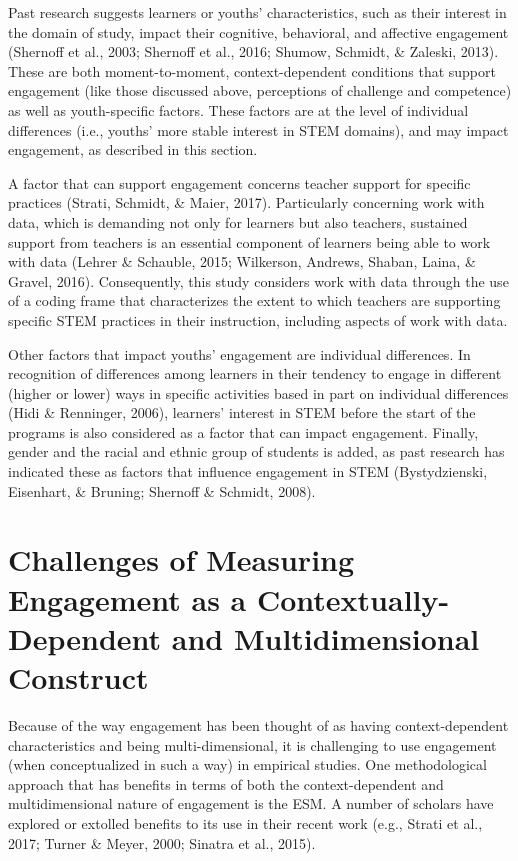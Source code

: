 \documentclass[]{book}
\theoremstyle{definition}
\theoremstyle{definition}
\theoremstyle{definition}
\theoremstyle{remark}
\begin{document}
Past research suggests learners or youths' characteristics, such as
their interest in the domain of study, impact their cognitive,
behavioral, and affective engagement (Shernoff et al., 2003; Shernoff et
al., 2016; Shumow, Schmidt, \& Zaleski, 2013). These are both
moment-to-moment, context-dependent conditions that support engagement
(like those discussed above, perceptions of challenge and competence) as
well as youth-specific factors. These factors are at the level of
individual differences (i.e., youths' more stable interest in STEM
domains), and may impact engagement, as described in this section.

A factor that can support engagement concerns teacher support for
specific practices (Strati, Schmidt, \& Maier, 2017). Particularly
concerning work with data, which is demanding not only for learners but
also teachers, sustained support from teachers is an essential component
of learners being able to work with data (Lehrer \& Schauble, 2015;
Wilkerson, Andrews, Shaban, Laina, \& Gravel, 2016). Consequently, this
study considers work with data through the use of a coding frame that
characterizes the extent to which teachers are supporting specific STEM
practices in their instruction, including aspects of work with data.

Other factors that impact youths' engagement are individual differences.
In recognition of differences among learners in their tendency to engage
in different (higher or lower) ways in specific activities based in part
on individual differences (Hidi \& Renninger, 2006), learners' interest
in STEM before the start of the programs is also considered as a factor
that can impact engagement. Finally, gender and the racial and ethnic
group of students is added, as past research has indicated these as
factors that influence engagement in STEM (Bystydzienski, Eisenhart, \&
Bruning; Shernoff \& Schmidt, 2008).

\section{Challenges of Measuring Engagement as a Contextually-Dependent
and Multidimensional
Construct}\label{challenges-of-measuring-engagement-as-a-contextually-dependent-and-multidimensional-construct}

Because of the way engagement has been thought of as having
context-dependent characteristics and being multi-dimensional, it is
challenging to use engagement (when conceptualized in such a way) in
empirical studies. One methodological approach that has benefits in
terms of both the context-dependent and multidimensional nature of
engagement is the ESM. A number of scholars have explored or extolled
benefits to its use in their recent work (e.g., Strati et al., 2017;
Turner \& Meyer, 2000; Sinatra et al., 2015).
\end{document}
